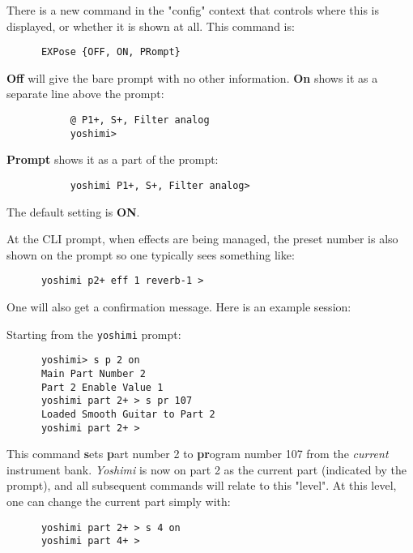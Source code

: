    There is a new command in the "config" context that controls where this is
   displayed, or whether it is shown at all.
   This command is:

   \begin{verbatim}
      EXPose {OFF, ON, PRompt}
   \end{verbatim}

   \textbf{Off} will give the bare prompt with no other information.
   \textbf{On} shows it as a separate line above the prompt:

   \begin{verbatim}
           @ P1+, S+, Filter analog
           yoshimi>
   \end{verbatim}

   \textbf{Prompt} shows it as a part of the prompt:

   \begin{verbatim}
           yoshimi P1+, S+, Filter analog>
   \end{verbatim}

   The default setting is \textbf{ON}.

   At the CLI prompt, when effects are being managed, the preset number is also
   shown on the prompt so one typically sees something like:

   \begin{verbatim}
      yoshimi p2+ eff 1 reverb-1 >
   \end{verbatim}

   One will also get a confirmation message.
   Here is an example session:

   Starting from the \texttt{yoshimi} prompt:

   \begin{verbatim}
      yoshimi> s p 2 on
      Main Part Number 2
      Part 2 Enable Value 1
      yoshimi part 2+ > s pr 107
      Loaded Smooth Guitar to Part 2
      yoshimi part 2+ >
   \end{verbatim}

   This command \textbf{s}ets \textbf{p}art number 2 to \textbf{pr}ogram
   number 107 from the \textsl{current} instrument bank.
   \textsl{Yoshimi} is now on part 2 as the current part (indicated by the
   prompt), and all subsequent commands will relate to this "level".
   At this level, one can change the current part simply with:

   \begin{verbatim}
      yoshimi part 2+ > s 4 on
      yoshimi part 4+ >
   \end{verbatim}

